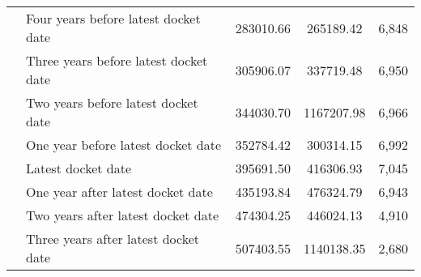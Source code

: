 \begin{tabular}{llccc}
 & Four years before latest docket date & 283010.66 & 265189.42 & 6,848 \\
 & Three years before latest docket date & 305906.07 & 337719.48 & 6,950 \\
 & Two years before latest docket date & 344030.70 & 1167207.98 & 6,966 \\
 & One year before latest docket date & 352784.42 & 300314.15 & 6,992 \\
 & Latest docket date & 395691.50 & 416306.93 & 7,045 \\
 & One year after latest docket date & 435193.84 & 476324.79 & 6,943 \\
 & Two years after latest docket date & 474304.25 & 446024.13 & 4,910 \\
 & Three years after latest docket date & 507403.55 & 1140138.35 & 2,680 \\
\cline{1-5}
\bottomrule
\end{tabular}
